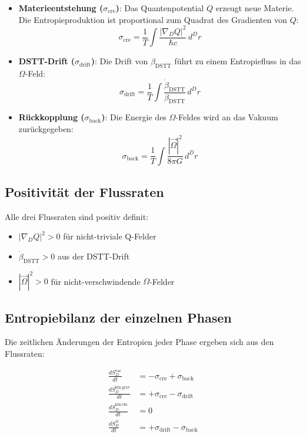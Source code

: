 \begin{itemize}
    \item \textbf{Materieentstehung ($\sigma_{\text{cre}}$)}:  
          Das Quantenpotential $Q$ erzeugt neue Materie. Die Entropieproduktion ist 
          proportional zum Quadrat des Gradienten von $Q$:
          \[
          \sigma_{\text{cre}} = \frac{1}{T} \int \frac{|\nabla_D Q|^2}{\hbar c} \, d^D r \tag{M.10}
          \]
    
    \item \textbf{DSTT-Drift ($\sigma_{\text{drift}}$)}:  
          Die Drift von $\beta_{\text{DSTT}}$ führt zu einem Entropiefluss in das 
          $\Omega$-Feld:
          \[
          \sigma_{\text{drift}} = \frac{1}{T} \int \frac{\dot{\beta}_{\text{DSTT}}}{\beta_{\text{DSTT}}} \, d^D r \tag{M.11}
          \]
    
    \item \textbf{Rückkopplung ($\sigma_{\text{back}}$)}:  
          Die Energie des $\Omega$-Feldes wird an das Vakuum zurückgegeben:
          \[
          \sigma_{\text{back}} = \frac{1}{T} \int \frac{|\vec{\Omega}|^2}{8\pi G} \, d^D r \tag{M.12}
          \]
\end{itemize}

\subsection{Positivität der Flussraten}

Alle drei Flussraten sind positiv definit:
\begin{itemize}
    \item $|\nabla_D Q|^2 > 0$ für nicht-triviale Q-Felder
    \item $\dot{\beta}_{\text{DSTT}} > 0$ aus der DSTT-Drift
    \item $|\vec{\Omega}|^2 > 0$ für nicht-verschwindende $\Omega$-Felder
\end{itemize}

\subsection{Entropiebilanz der einzelnen Phasen}

Die zeitlichen Änderungen der Entropien jeder Phase ergeben sich aus den Flussraten:

\begin{align}
\frac{dS_D^{\text{vac}}}{dt} &= -\sigma_{\text{cre}} + \sigma_{\text{back}} \tag{M.13a} \\
\frac{dS_D^{\text{kin,grav}}}{dt} &= +\sigma_{\text{cre}} - \sigma_{\text{drift}} \tag{M.13b} \\
\frac{dS_D^{\text{kin,em}}}{dt} &= 0 \tag{M.13c} \\
\frac{dS_D^{\Omega}}{dt} &= +\sigma_{\text{drift}} - \sigma_{\text{back}} \tag{M.13d}
\end{align}

